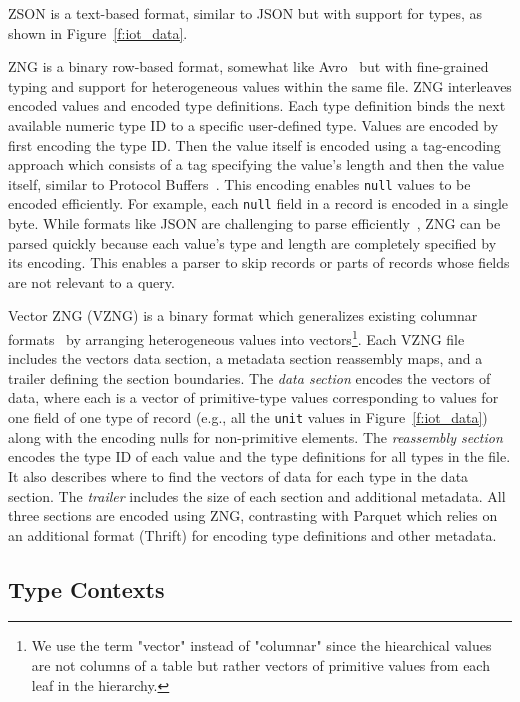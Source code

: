  ZSON is a text-based format, similar to JSON but with support for types, as shown in Figure~\ref{f:iot_data}.

 ZNG is a binary row-based format, somewhat like Avro~\cite{avro} but with fine-grained typing and support for heterogeneous values within the same file. ZNG interleaves encoded values and encoded type definitions. Each type definition binds the next available numeric type ID to a specific user-defined type. Values are encoded by first encoding the type ID. Then the value itself is encoded using a tag-encoding approach which consists of a tag specifying the value's length and then the value itself, similar to Protocol Buffers~\cite{protobufs}. This encoding enables \texttt{null} values to be encoded efficiently. For example, each \texttt{null} field in a record is encoded in a single byte. While formats like JSON are challenging to parse efficiently~, ZNG can be parsed quickly because each value's type and length are completely specified by its encoding. This enables a parser to skip records or parts of records whose fields are not relevant to a query.

 Vector ZNG (VZNG) is a binary format which generalizes existing columnar formats~ by arranging heterogeneous values into vectors\footnote{We use the term "vector" instead of "columnar" since the hiearchical values are not columns of a table but rather vectors of primitive values from each leaf in the hierarchy.}. Each VZNG file includes the vectors data section, a metadata section reassembly maps, and a trailer defining the section boundaries. The {\em data section} encodes the vectors of data, where each is a vector of primitive-type values corresponding to values for one field of one type of record (e.g., all the \texttt{unit} values in Figure~\ref{f:iot_data}) along with the encoding nulls for non-primitive elements. The {\em reassembly section} encodes the type ID of each value and the type definitions for all types in the file. It also describes where to find the vectors of data for each type in the data section. The {\em trailer} includes the size of each section and additional metadata. All three sections are encoded using ZNG, contrasting with Parquet which relies on an additional format (Thrift) for encoding type definitions and other metadata.


\subsection{\sys{} Type Contexts} \label{ss:zed_type_contexts}

